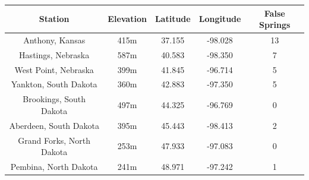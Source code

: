\documentclass{article}\usepackage[]{graphicx}\usepackage[]{color}
\begin{document}
\begin{center}
 \label{tab:title2} 
\begin{tabular}{|c|c|c|c|c|}
\hline
Station & Elevation & Latitude & Longitude & False Springs \\
\hline
Anthony, Kansas & 415m & 37.155 & -98.028 & 13 \\
Hastings, Nebraska & 587m & 40.583 & -98.350  & 7 \\
West Point, Nebraska & 399m & 41.845 & -96.714 & 5 \\
Yankton, South Dakota & 360m & 42.883 & -97.350 & 5 \\
Brookings, South Dakota & 497m & 44.325 & -96.769 & 0 \\
Aberdeen, South Dakota & 395m & 45.443 & -98.413 & 2 \\
Grand Forks, North Dakota & 253m & 47.933 & -97.083 & 0 \\
Pembina, North Dakota & 241m & 48.971 & -97.242 & 1 \\
\hline
\end{tabular}
\end{center}
\end{document}
